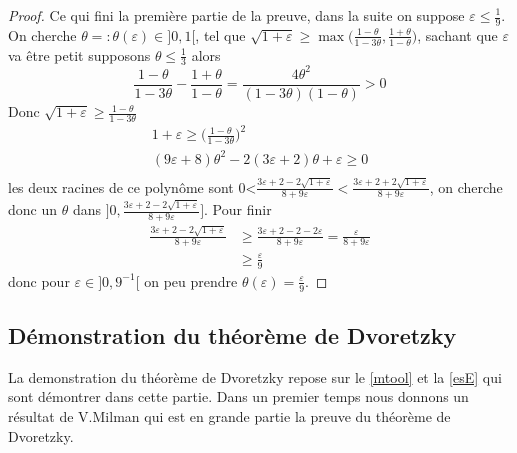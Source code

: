 \documentclass[12pt]{article}
\theoremstyle{definition}
\begin{document}
\begin{proof}
	Ce qui fini la première partie de la preuve, dans la suite on suppose $\varepsilon\leq \frac{1}{9}$. On cherche $\theta=:\theta(\varepsilon)\in]0,1[$, tel que $\sqrt{1+\varepsilon}\geq \max\big(\frac{1-\theta}{1-3\theta},\frac{1+\theta}{1-\theta}\big)$, sachant que $\varepsilon$ va être petit supposons $\theta\leq \frac{1}{3}$ alors
	\begin{equation*}
	\frac{1-\theta}{1-3\theta}-\frac{1+\theta}{1-\theta} = \frac{4\theta^2}{(1-3\theta) (1-\theta)}>0
	\end{equation*}
	Donc $\sqrt{1+\varepsilon}\geq \frac{1-\theta}{1-3\theta}$
	\begin{equation*}
	\begin{array}{ccc}
	1+\varepsilon \geq  \big(\frac{1-\theta}{1-3\theta}\big)^2\\
	(9\varepsilon+8)\theta^2 - 2(3\varepsilon+2)\theta +\varepsilon \geq 0\\
	\end{array}
	\end{equation*}
	les deux racines de ce polynôme sont 0<$\frac{3\varepsilon+2-2\sqrt{1+\varepsilon}}{8+9\varepsilon}<\frac{3\varepsilon+2+2\sqrt{1+\varepsilon}}{8+9\varepsilon}$, on cherche donc un $\theta$ dans $]0,\frac{3\varepsilon+2-2\sqrt{1+\varepsilon}}{8+9\varepsilon}]$. Pour finir 
	\begin{align*}
	\frac{3\varepsilon+2-2\sqrt{1+\varepsilon}}{8+9\varepsilon}&\geq \frac{3\varepsilon+2-2-2\varepsilon}{8+9\varepsilon}=\frac{\varepsilon}{8+9\varepsilon}\\
	&\geq \frac{\varepsilon}{9}
	\end{align*}
	donc pour $\varepsilon\in]0,9^{-1}[$ on peu prendre $\theta(\varepsilon)=\frac{\varepsilon}{9}$.
\end{proof}


\subsection{Démonstration du théorème de Dvoretzky}
La demonstration du théorème de Dvoretzky repose sur le \cref{mtool} et la \cref{esE} qui sont démontrer dans cette partie. Dans un premier temps nous donnons un résultat de V.Milman qui est en grande partie la preuve du théorème de Dvoretzky.
\end{document}
